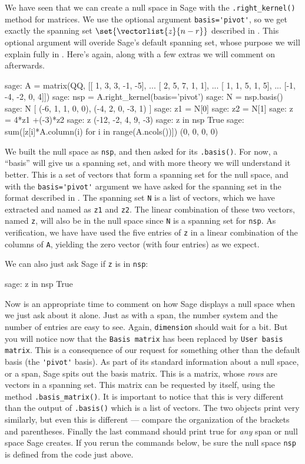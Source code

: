 We have seen that we can create a null space in Sage with the \verb?.right_kernel()? method for matrices.  We use the optional argument \verb?basis='pivot'?, so we get exactly the spanning set $\set{\vectorlist{z}{n-r}}$ described in .  This optional argument will overide Sage's default spanning set, whose purpose we will explain fully in .  Here's  again, along with a few extras we will comment on afterwards.
%
\begin{sageexample}
sage: A = matrix(QQ, [[ 1,  3,  3, -1, -5],
...                   [ 2,  5,  7,  1,  1],
...                   [ 1,  1,  5,  1,  5],
...                   [-1, -4, -2,  0,  4]])
sage: nsp = A.right_kernel(basis='pivot')
sage: N = nsp.basis()
sage: N
[
(-6, 1, 1, 0, 0),
(-4, 2, 0, -3, 1)
]
sage: z1 = N[0]
sage: z2 = N[1]
sage: z = 4*z1 +(-3)*z2
sage: z
(-12, -2, 4, 9, -3)
sage: z in nsp
True
sage: sum([z[i]*A.column(i) for i in range(A.ncols())])
(0, 0, 0, 0)
\end{sageexample}
%
We built the null space as \verb?nsp?, and then asked for its \verb?.basis()?.  For now, a ``basis'' will give us a spanning set, and with more theory we will understand it better.  This is a set of vectors that form a spanning set for the null space, and with the \verb?basis='pivot'? argument we have asked for the spanning set in the format described in .  The spanning set \verb?N? is a list of vectors, which we have extracted and named as \verb?z1? and \verb?z2?.  The linear combination of these two vectors, named \verb?z?, will also be in the null space since \verb?N? is a spanning set for \verb?nsp?.  As verification, we have have used the five entries of \verb?z? in a linear combination of the columns of \verb?A?, yielding the zero vector (with four entries) as we expect.\par
%
We can also just ask Sage if \verb?z? is in \verb?nsp?:
%
\begin{sageexample}
sage: z in nsp
True
\end{sageexample}
%
Now is an appropriate time to comment on how Sage displays a null space when we just ask about it alone.  Just as with a span, the number system and the number of entries are easy to see.  Again, \verb?dimension? should wait for a bit.  But you will notice now that the \verb?Basis matrix? has been replaced by \verb?User basis matrix?.  This is a consequence of our request for something other than the default basis (the \verb?'pivot'? basis).  As part of its standard information about a null space, or a span, Sage spits out the basis matrix.  This is a matrix, whose \emph{rows} are vectors in a spanning set.  This matrix can be requested by itself, using the method \verb?.basis_matrix()?.  It is important to notice that this is very different than the output of \verb?.basis()? which is a list of vectors.  The two objects print very similarly, but even this is different --- compare the organization of the brackets and parentheses.  Finally the last command should print true for \emph{any} span or null space Sage creates.  If you rerun the commands below, be sure the null space \verb?nsp? is defined from the code just above.
